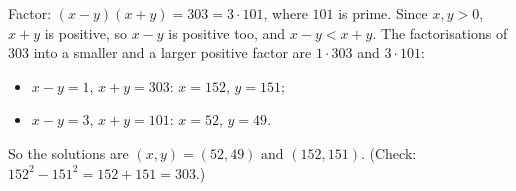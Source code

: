 Factor: $(x-y)(x+y)=303=3\cdot101$, where $101$ is prime. Since $x,y>0$, $x+y$ is positive, so $x-y$ is positive too, and $x-y<x+y$. The factorisations of $303$ into a smaller and a larger positive factor are $1\cdot303$ and $3\cdot101$:
\begin{itemize}
\item $x-y=1$, $x+y=303$: $x=152$, $y=151$;
\item $x-y=3$, $x+y=101$: $x=52$, $y=49$.
\end{itemize}
So the solutions are $\boxed{(x,y)=(52,49)\text{ and }(152,151)}$. (Check: $152^2-151^2=152+151=303$.)
